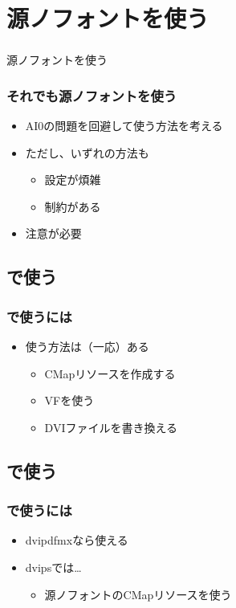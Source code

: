 \section{源ノフォントを使う}
\begin{frame}\frametitle{}
  \centering
  源ノフォントを使う
\end{frame}

\begin{frame}\frametitle{それでも源ノフォントを使う}
  \begin{itemize}
  \item AI0の問題を回避して使う方法を考える
  \item ただし、いずれの方法も
    \begin{itemize}
    \item 設定が煩雑
    \item 制約がある
    \end{itemize}
  \item 注意が必要
  \end{itemize}
\end{frame}

\subsection{\pTeX で使う}
\begin{frame}\frametitle{\pTeX で使うには}
  \begin{itemize}
  \item 使う方法は（一応）ある
    \begin{itemize}
    \item CMapリソースを作成する
    \item VFを使う
    \item DVIファイルを書き換える
    \end{itemize}
  \end{itemize}
\end{frame}

\subsection{\upTeX で使う}
\begin{frame}\frametitle{\upTeX で使うには}
  \begin{itemize}
  \item dvipdfmxなら使える
  \item dvipsでは…
    \begin{itemize}
    \item 源ノフォントのCMapリソースを使う
    \end{itemize}
  \end{itemize}
\end{frame}

